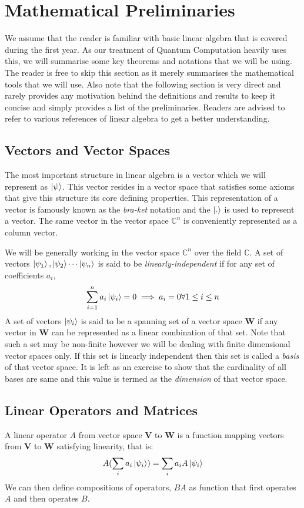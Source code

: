 \section{Mathematical Preliminaries}

We assume that the reader is familiar with basic linear algebra that is covered during the first year. As our treatment of Quantum Computation heavily uses this, we will summarise some key theorems and notations that we will be using. The reader is free to skip this section as it merely summarises the mathematical tools that we will use. Also note that the following section is very direct and rarely provides any motivation behind the definitions and results to keep it concise and simply provides a list of the preliminaries. Readers are advised to refer to various references of linear algebra to get a better understanding.

\subsection{Vectors and Vector Spaces}
The most important structure in linear algebra is a vector which we will represent as $\ket{\psi}$. This vector resides in a vector space that satisfies some axioms that give this structure its core defining properties. This representation of a vector is famously known as the \textit{bra-ket} notation and the $\ket{.}$ is used to represent a vector. The same vector in the vector space $\mathbb{C}^{n}$ is conveniently represented as a column vector.

We will be generally working in the vector space $\mathbb{C}^{n}$ over the field $\mathbb{C}$.
A set of vectors $\ket{\psi_{1}}, \ket{\psi_{2}} \cdots \ket{\psi_{n}}$ is said to be \textit{linearly-independent} if for any set of coefficients ${a_i}$, 
$$\sum_{i=1}^{n} a_i\ket{\psi_{i}} = 0 \implies a_i = 0   \forall   1 \leq i \leq n$$
A set of vectors ${\ket{\psi_{i}}}$ is said to be a spanning set of a vector space $\textbf{W}$ if any vector in $\textbf{W}$ can be represented as a linear combination of that set. Note that such a set may be non-finite however we will be dealing with finite dimensional vector spaces only. If this set is linearly independent then this set is called a \textit{basis} of that vector space. It is left as an exercise to show that the cardinality of all bases are same and this value is termed as the \textit{dimension} of that vector space.

\subsection{Linear Operators and Matrices}
A linear operator $A$ from vector space \textbf{V} to \textbf{W} is a function mapping vectors from \textbf{V} to \textbf{W} satisfying linearity, that is:
$$ A(\sum_{i} a_i \ket{\psi_{i}}) = \sum_{i} a_{i}A\ket{\psi_{i}} $$ 
We can then define compositions of operators, $BA$ as function that first operates $A$ and then operates $B$. 

